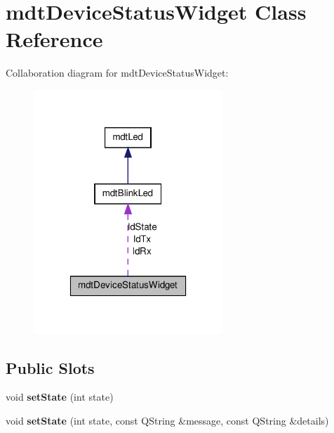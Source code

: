 \hypertarget{classmdt_device_status_widget}{
\section{mdtDeviceStatusWidget Class Reference}
\label{classmdt_device_status_widget}
}


Collaboration diagram for mdtDeviceStatusWidget:\nopagebreak
\begin{figure}[H]
\begin{center}
\leavevmode
\includegraphics[width=202pt]{classmdt_device_status_widget__coll__graph}
\end{center}
\end{figure}
\subsection*{Public Slots}
\begin{DoxyCompactItemize}
\item 
\hypertarget{classmdt_device_status_widget_aff26f53555fcaf57d79d70c712e24928}{
void {\bfseries setState} (int state)}
\label{classmdt_device_status_widget_aff26f53555fcaf57d79d70c712e24928}

\item 
\hypertarget{classmdt_device_status_widget_af9d0bf5fb74e55bcdab7c8bd86ddfa33}{
void {\bfseries setState} (int state, const QString \&message, const QString \&details)}
\label{classmdt_device_status_widget_af9d0bf5fb74e55bcdab7c8bd86ddfa33}

\end{DoxyCompactItemize}
